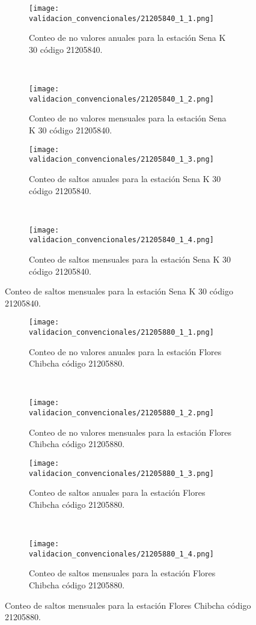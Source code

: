 \begin{figure}[H]\ContinuedFloat
\centering
	\begin{subfigure}[normla]{0.4\textwidth}
	\texttt{[image: validacion\_convencionales/21205840\_1\_1.png]}
		\caption{Conteo de no valores anuales para la estación Sena K 30 código 21205840.}
		\label{subfig:a1}
		\end{subfigure}
		~
    \begin{subfigure}[normla]{0.4\textwidth}
	\texttt{[image: validacion\_convencionales/21205840\_1\_2.png]}
		\caption{Conteo de no valores mensuales para la estación Sena K 30 código 21205840.}
		\label{subfig:a2}
		\end{subfigure}
		
    \begin{subfigure}[normla]{0.4\textwidth}
	\texttt{[image: validacion\_convencionales/21205840\_1\_3.png]}
		\caption{Conteo de saltos anuales para la estación Sena K 30 código 21205840.}
		\label{subfig:a1}
		\end{subfigure}
		~
    \begin{subfigure}[normla]{0.4\textwidth}
	\texttt{[image: validacion\_convencionales/21205840\_1\_4.png]}
		\caption{Conteo de saltos mensuales para la estación Sena K 30 código 21205840.}
		\label{subfig:a2}
		\end{subfigure}

	
\end{figure}
           
\begin{figure}[H]
	\centering
	\begin{subfigure}[normla]{0.4\textwidth}
	\texttt{[image: validacion\_convencionales/21205880\_1\_1.png]}
		\caption{Conteo de no valores anuales para la estación Flores Chibcha código 21205880.}
		\label{subfig:a1}
		\end{subfigure}
		~
    \begin{subfigure}[normla]{0.4\textwidth}
	\texttt{[image: validacion\_convencionales/21205880\_1\_2.png]}
		\caption{Conteo de no valores mensuales para la estación Flores Chibcha código 21205880.}
		\label{subfig:a2}
		\end{subfigure}
		
    \begin{subfigure}[normla]{0.4\textwidth}
	\texttt{[image: validacion\_convencionales/21205880\_1\_3.png]}
		\caption{Conteo de saltos anuales para la estación Flores Chibcha código 21205880.}
		\label{subfig:a1}
		\end{subfigure}
		~
    \begin{subfigure}[normla]{0.4\textwidth}
	\texttt{[image: validacion\_convencionales/21205880\_1\_4.png]}
		\caption{Conteo de saltos mensuales para la estación Flores Chibcha código 21205880.}
		\label{subfig:a2}
		\end{subfigure}

	
\end{figure}
           
